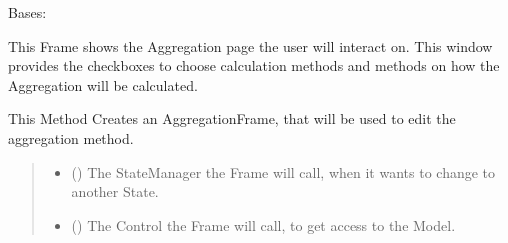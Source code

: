 \documentclass[letterpaper,10pt,english]{sphinxmanual}
\begin{document}
\begin{fulllineitems}
\label{\detokenize{apidoc/src.osm_configurator.view.toplevelframes:src.osm_configurator.view.toplevelframes.aggregation_frame.AggregationFrame}}
\pysigstartsignatures
{}
\pysigstopsignatures
\sphinxAtStartPar
Bases: {\hyperref[\detokenize{apidoc/src.osm_configurator.view.toplevelframes:src.osm_configurator.view.toplevelframes.top_level_frame.TopLevelFrame}]{}}

\sphinxAtStartPar
This Frame shows the Aggregation page the user will interact on.
This window provides the checkboxes to choose calculation methods and methods on how the Aggregation will be calculated.

\begin{fulllineitems}
\label{\detokenize{apidoc/src.osm_configurator.view.toplevelframes:src.osm_configurator.view.toplevelframes.aggregation_frame.AggregationFrame.__init__}}
\pysigstartsignatures
{}
\pysigstopsignatures
\sphinxAtStartPar
This Method Creates an AggregationFrame, that will be used to edit the aggregation method.
\begin{quote}\begin{description}
\begin{itemize}
\item {} 
\sphinxAtStartPar
{} ({\hyperref[\detokenize{apidoc/src.osm_configurator.view.states:src.osm_configurator.view.states.state_manager.StateManager}]{}}) \textendash{} The StateManager the Frame will call, when it wants to change to another State.

\item {} 
\sphinxAtStartPar
{} ({\hyperref[\detokenize{apidoc/src.osm_configurator.control:src.osm_configurator.control.control_interface.IControl}]{}}) \textendash{} The Control the Frame will call, to get access to the Model.

\end{itemize}

\end{description}\end{quote}

\end{fulllineitems}


\end{fulllineitems}
\end{document}
